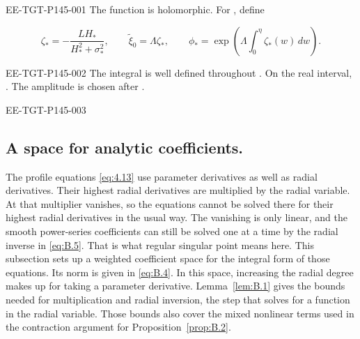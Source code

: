 %
\begin{EESegment}{EE-TGT-P145-001}
The function  is holomorphic. For
, define
\end{EESegment}
\begin{equation}
  \zeta_*=-\frac{LH_*}{H_*^2+\sigma_*^2},
  \qquad \widetilde\xi_0=\Lambda\zeta_*,
  \qquad \phi_*=\exp\!\left(\Lambda\int_0^\eta \zeta_*(w)\,dw\right).
  \tag{B.3}\label{eq:B.3}
\end{equation}
\begin{EESegment}{EE-TGT-P145-002}
The integral is well defined throughout . On the real interval,
. The amplitude  is chosen after
.
\end{EESegment}

\begin{EESegment}{EE-TGT-P145-003}
\subsection{A space for analytic coefficients.}\label{sec:B.2}
The profile equations \eqref{eq:4.13} use parameter derivatives as well as radial derivatives. Their highest radial
derivatives are multiplied by the radial variable. At  that multiplier
vanishes, so the equations cannot be solved there for their highest radial derivatives in the
usual way. The vanishing is only linear, and the smooth power-series coefficients can still be
solved one at a time by the radial inverse in \eqref{eq:B.5}. That is what regular singular point
means here. This subsection sets up a weighted
coefficient space  for the integral form of those equations. Its
norm is given in \eqref{eq:B.4}. In this space, increasing the radial degree makes up for taking a
parameter derivative. Lemma~\ref{lem:B.1} gives the bounds needed for multiplication and radial
inversion, the step that solves for a function in the radial variable. Those bounds also cover the
mixed nonlinear terms used in the contraction argument for Proposition~\ref{prop:B.2}.
\end{EESegment}

